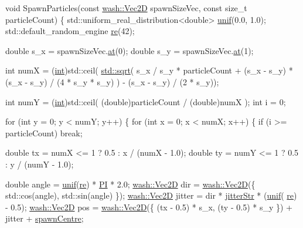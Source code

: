 \begin{DoxyCode}
\textcolor{keywordtype}{void} SpawnParticles(\textcolor{keyword}{const} \mbox{\hyperlink{classwash_1_1Vec}{wash::Vec2D}} spawnSizeVec, \textcolor{keyword}{const} \textcolor{keywordtype}{size\_t} particleCount) \{
    std::uniform\_real\_distribution<double> \mbox{\hyperlink{vector__test_8cpp_a3757a8b93144971a314801d61dccfdcb}{unif}}(0.0, 1.0);
    std::default\_random\_engine \mbox{\hyperlink{vector__test_8cpp_a2ee18289ce89962484f3b5227d11faf6}{re}}(42);

    \textcolor{keywordtype}{double} s\_x = spawnSizeVec.\mbox{\hyperlink{classwash_1_1Vec_a1be26013b6d4f898b8504fc258043400}{at}}(0);
    \textcolor{keywordtype}{double} s\_y = spawnSizeVec.\mbox{\hyperlink{classwash_1_1Vec_a1be26013b6d4f898b8504fc258043400}{at}}(1);

    \textcolor{keywordtype}{int} numX = (\mbox{\hyperlink{namespacecompare__solutions_a73d633d24717b7bdfb5ba69fd060eabc}{int}})std::ceil( \mbox{\hyperlink{namespacewash_aa7c01695ae3be583edc0ed8c4bd756f5}{std::sqrt}}(
        s\_x / s\_y * particleCount + (s\_x - s\_y) * (s\_x - s\_y) / (4 * s\_y * s\_y)
    ) - (s\_x - s\_y) / (2 * s\_y));

    \textcolor{keywordtype}{int} numY = (\mbox{\hyperlink{namespacecompare__solutions_a73d633d24717b7bdfb5ba69fd060eabc}{int}})std::ceil( (\textcolor{keywordtype}{double})particleCount / (double)numX );
    \textcolor{keywordtype}{int} i = 0;

    \textcolor{keywordflow}{for} (\textcolor{keywordtype}{int} y = 0; y < numY; y++) \{
        \textcolor{keywordflow}{for} (\textcolor{keywordtype}{int} x = 0; x < numX; x++) \{
            \textcolor{keywordflow}{if} (i >= particleCount) \textcolor{keywordflow}{break};

            \textcolor{keywordtype}{double} tx = numX <= 1 ? 0.5 : x / (numX - 1.0);
            \textcolor{keywordtype}{double} ty = numY <= 1 ? 0.5 : y / (numY - 1.0);

            \textcolor{keywordtype}{double} angle = \mbox{\hyperlink{vector__test_8cpp_a3757a8b93144971a314801d61dccfdcb}{unif}}(\mbox{\hyperlink{vector__test_8cpp_a2ee18289ce89962484f3b5227d11faf6}{re}}) * \mbox{\hyperlink{3d__fluid__sim_2fluid__sim_8hpp_a598a3330b3c21701223ee0ca14316eca}{PI}} * 2.0;
            \mbox{\hyperlink{classwash_1_1Vec}{wash::Vec2D}} dir = \mbox{\hyperlink{namespacewash_a905f2d902fc7aaab0e8a58b6ee25baf1}{wash::Vec2D}}(\{ std::cos(angle), std::sin(angle) \});
            \mbox{\hyperlink{classwash_1_1Vec}{wash::Vec2D}} jitter = dir * \mbox{\hyperlink{ca__fluid__sim_2fluid__sim_8cpp_a39140666db6cb0c2fa813506654e739b}{jitterStr}} * (\mbox{\hyperlink{vector__test_8cpp_a3757a8b93144971a314801d61dccfdcb}{unif}}(
      \mbox{\hyperlink{vector__test_8cpp_a2ee18289ce89962484f3b5227d11faf6}{re}}) - 0.5);
            \mbox{\hyperlink{classwash_1_1Vec}{wash::Vec2D}} pos = \mbox{\hyperlink{namespacewash_a905f2d902fc7aaab0e8a58b6ee25baf1}{wash::Vec2D}}(\{ (tx - 0.5) * s\_x, (ty - 0.5) * s\_y \}) + 
      jitter + \mbox{\hyperlink{ca__fluid__sim_2fluid__sim_8cpp_a57d93ce8b44133ed956acc10a45e6223}{spawnCentre}};


\end{DoxyCode}
